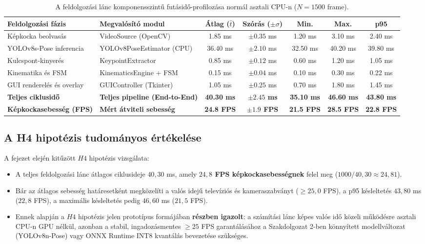 \documentclass[12pt,a4paper,oneside]{report}
\begin{document}
\begin{table}[H]
\centering
\small
\begin{tabularx}{\textwidth}{lXccccc}
\toprule
\textbf{Feldolgozási fázis} & \textbf{Megvalósító modul} & \textbf{Átlag ($\bar{t}$)} & \textbf{Szórás ($\pm\sigma$)} & \textbf{Min.} & \textbf{Max.} & \textbf{p95} \\
\midrule
Képkocka beolvasás & VideoSource (OpenCV) & 1.85 ms & $\pm 0.35$ ms & 1.20 ms & 3.10 ms & 2.40 ms \\
YOLOv8s-Pose inferencia & YOLOv8PoseEstimator (CPU) & 36.40 ms & $\pm 2.10$ ms & 32.50 ms & 40.20 ms & 39.80 ms \\
Kulcspont-kinyerés & KeypointExtractor & 0.85 ms & $\pm 0.12$ ms & 0.60 ms & 1.20 ms & 1.05 ms \\
Kinematika és FSM & KinematicsEngine + FSM & 0.15 ms & $\pm 0.04$ ms & 0.10 ms & 0.30 ms & 0.22 ms \\
GUI renderelés és overlay & GUIController (Tkinter) & 1.05 ms & $\pm 0.25$ ms & 0.70 ms & 1.80 ms & 1.45 ms \\
\midrule
\textbf{Teljes ciklusidő} & \textbf{Teljes pipeline (End-to-End)} & \textbf{40.30 ms} & \textbf{$\pm 2.45$ ms} & \textbf{35.10 ms} & \textbf{46.60 ms} & \textbf{43.80 ms} \\
\textbf{Képkockasebesség (FPS)} & \textbf{Mért átviteli sebesség} & \textbf{24.8 FPS} & \textbf{$\pm 1.9$ FPS} & \textbf{21.5 FPS} & \textbf{28.5 FPS} & \textbf{22.8 FPS} \\
\bottomrule
\end{tabularx}
\caption{A feldolgozási lánc komponensszintű futásidő-profilozása normál asztali CPU-n ($N=1500$ frame).}
\label{tab:profiling}
\end{table}

\subsection{A H4 hipotézis tudományos értékelése}
A fejezet elején kitűzött $H4$ hipotézis vizsgálata:
\begin{itemize}
    \item A teljes feldolgozási lánc átlagos ciklusideje $40{,}30$ ms, amely \textbf{$24{,}8$ FPS képkockasebességnek} felel meg ($1000 / 40{,}30 \approx 24{,}81$).
    \item Bár az átlagos sebesség határesetként megközelíti a valós idejű televíziós és kameraszabványt ($\ge 25{,}0$ FPS), a p95 késleltetés $43{,}80$ ms ($22{,}8$ FPS), a maximális késleltetés pedig $46{,}60$ ms ($21{,}5$ FPS).
    \item Ennek alapján a $H4$ hipotézis jelen prototípus formájában \textbf{részben igazolt}: a számítási lánc képes valós idő közeli működésre asztali CPU-n GPU nélkül, azonban a stabil, ingadozásmentes $\ge 25$ FPS garantálásához a Szakdolgozat 2-ben könnyített modellváltozat (YOLOv8n-Pose) vagy ONNX Runtime INT8 kvantálás bevezetése szükséges.
\end{itemize}
\end{document}
